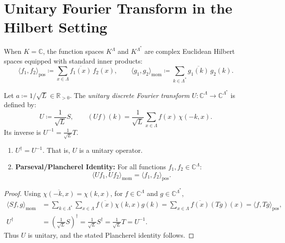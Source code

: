 \section{Unitary Fourier Transform in the Hilbert Setting}

When $K = \mathbb{C}$, the function spaces $K^\Lambda$ and $K^{\Lambda^*}$ are complex Euclidean Hilbert spaces equipped with standard inner products:
\begin{equation}
\langle f_1, f_2 \rangle_{\mathrm{pos}} \coloneqq \sum_{x \in \Lambda} \overline{f_1(x)}\, f_2(x), \qquad \langle g_1, g_2 \rangle_{\mathrm{mom}} \coloneqq \sum_{k \in \Lambda^*} \overline{g_1(k)}\, g_2(k).
\end{equation}

\begin{definition}
Let $a \coloneqq 1/\sqrt{L} \in \mathbb{R}_{>0}$. The \emph{unitary discrete Fourier transform} $U : \mathbb{C}^\Lambda \to \mathbb{C}^{\Lambda^*}$ is defined by:
\begin{equation}
U \coloneqq \frac{1}{\sqrt{L}} S, \qquad (U f)(k) = \frac{1}{\sqrt{L}} \sum_{x \in \Lambda} f(x)\, \chi(-k, x).
\end{equation}
Its inverse is $U^{-1} = \frac{1}{\sqrt{L}} T$.
\end{definition}

\begin{theorem}
\label{thm:unitary_plancherel}
\begin{enumerate}
    \item $U^\dagger = U^{-1}$. That is, $U$ is a unitary operator.
    \item \textbf{Parseval/Plancherel Identity:} For all functions $f_1, f_2 \in \mathbb{C}^\Lambda$:
    \begin{equation}
    \langle U f_1, U f_2 \rangle_{\mathrm{mom}} = \langle f_1, f_2 \rangle_{\mathrm{pos}}.
    \end{equation}
\end{enumerate}
\end{theorem}

\begin{proof}
Using $\overline{\chi(-k,x)}=\chi(k,x)$, for $f\in\mathbb C^\Lambda$ and $g\in\mathbb C^{\Lambda^*}$,
\begin{align}
\langle Sf,g\rangle_{\mathrm{mom}}
&=\sum_{k\in\Lambda^*}\sum_{x\in\Lambda}\overline{f(x)}\chi(k,x)g(k)
=\sum_{x\in\Lambda}\overline{f(x)}(Tg)(x)
=\langle f,Tg\rangle_{\mathrm{pos}},\\
U^\dagger&=\left(\frac1{\sqrt L}S\right)^\dagger
=\frac1{\sqrt L}S^\dagger
=\frac1{\sqrt L}T=U^{-1}.
\end{align}
Thus $U$ is unitary, and the stated Plancherel identity follows.
\end{proof}

